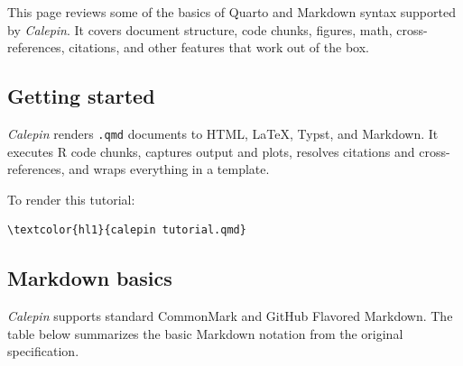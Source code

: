 This page reviews some of the basics of Quarto and Markdown syntax supported by \emph{Calepin}. It covers document structure, code chunks, figures, math, cross-references, citations, and other features that work out of the box.

\subsection{Getting started}
\label{getting-started}

\emph{Calepin} renders \texttt{.qmd} documents to HTML, LaTeX, Typst, and Markdown. It executes R code chunks, captures output and plots, resolves citations and cross-references, and wraps everything in a template.

To render this tutorial:




\begin{srccode}
\begin{Verbatim}[commandchars=\\\{\}]
\textcolor{hl1}{calepin tutorial.qmd}
\end{Verbatim}
\end{srccode}

\subsection{Markdown basics}
\label{markdown-basics}

\emph{Calepin} supports standard CommonMark and GitHub Flavored Markdown. The table below summarizes the basic Markdown notation from the original specification.



